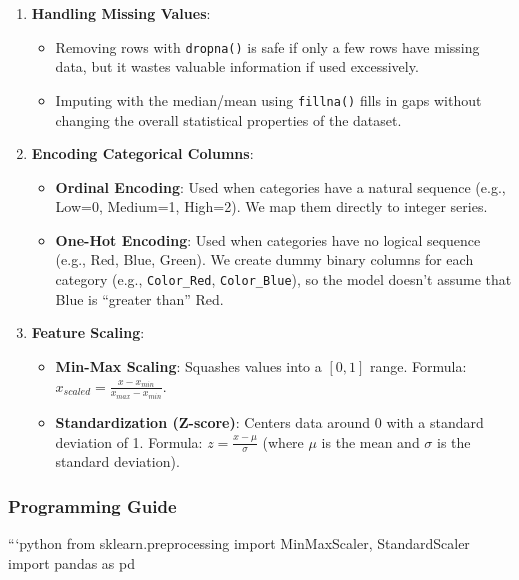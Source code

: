 \begin{enumerate}
\def\labelenumi{\arabic{enumi}.}
\tightlist
\item
  \textbf{Handling Missing Values}:

  \begin{itemize}
  \tightlist
  \item
    Removing rows with \texttt{dropna()} is safe if only a few rows have
    missing data, but it wastes valuable information if used
    excessively.
  \item
    Imputing with the median/mean using \texttt{fillna()} fills in gaps
    without changing the overall statistical properties of the dataset.
  \end{itemize}
\item
  \textbf{Encoding Categorical Columns}:

  \begin{itemize}
  \tightlist
  \item
    \textbf{Ordinal Encoding}: Used when categories have a natural
    sequence (e.g., Low=0, Medium=1, High=2). We map them directly to
    integer series.
  \item
    \textbf{One-Hot Encoding}: Used when categories have no logical
    sequence (e.g., Red, Blue, Green). We create dummy binary columns
    for each category (e.g., \texttt{Color\_Red}, \texttt{Color\_Blue}),
    so the model doesn't assume that Blue is ``greater than'' Red.
  \end{itemize}
\item
  \textbf{Feature Scaling}:

  \begin{itemize}
  \tightlist
  \item
    \textbf{Min-Max Scaling}: Squashes values into a \([0, 1]\) range.
    Formula: \(x_{scaled} = \frac{x - x_{min}}{x_{max} - x_{min}}\).
  \item
    \textbf{Standardization (Z-score)}: Centers data around 0 with a
    standard deviation of 1. Formula: \(z = \frac{x - \mu}{\sigma}\)
    (where \(\mu\) is the mean and \(\sigma\) is the standard
    deviation).
  \end{itemize}
\end{enumerate}

\subsubsection{Programming Guide}\label{programming-guide-1}

```python from sklearn.preprocessing import MinMaxScaler, StandardScaler
import pandas as pd

